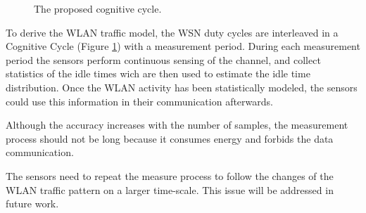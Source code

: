 \begin{figure}[!htbp]
	\begin{center}
		
	\end{center}
	\caption{The proposed cognitive cycle.}
	\label{fig:cogn_cycle}
\end{figure}

To derive the \ac{WLAN} traffic model, the \ac{WSN} duty cycles are interleaved in a Cognitive Cycle (Figure \ref{fig:cogn_cycle}) with a measurement period. During each measurement period the sensors perform continuous sensing of the channel, and collect statistics of the idle times wich are then used to estimate the idle time distribution. Once the \ac{WLAN} activity has been statistically modeled, the sensors could use this information in their communication afterwards.

Although the accuracy increases with the number of samples, the measurement process should not be long because it consumes energy and forbids the data communication.

The sensors need to repeat the measure process to follow the changes of the \ac{WLAN} traffic pattern on a larger time-scale. This issue will be addressed in future work.
